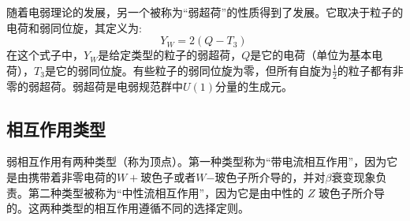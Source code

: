 随着电弱理论的发展，另一个被称为“弱超荷”的性质得到了发展。它取决于粒子的电荷和弱同位旋，其定义为:
$$Y_{W}=2(Q-T_{3})~$$
在这个式子中，$Y_{W}$是给定类型的粒子的弱超荷，$Q$是它的电荷（单位为基本电荷），$T_{3}$是它的弱同位旋。有些粒子的弱同位旋为零，但所有自旋为$\frac{1}{2}$的粒子都有非零的弱超荷。弱超荷是电弱规范群中$U(1)$分量的生成元。

\subsection{ 相互作用类型}
弱相互作用有两种类型（称为顶点）。第一种类型称为“带电流相互作用”，因为它是由携带着非零电荷的$W+$玻色子或者$W$−玻色子所介导的，并对$\beta$衰变现象负责。第二种类型被称为“中性流相互作用”，因为它是由中性的 $Z$ 玻色子所介导的。这两种类型的相互作用遵循不同的选择定则。
